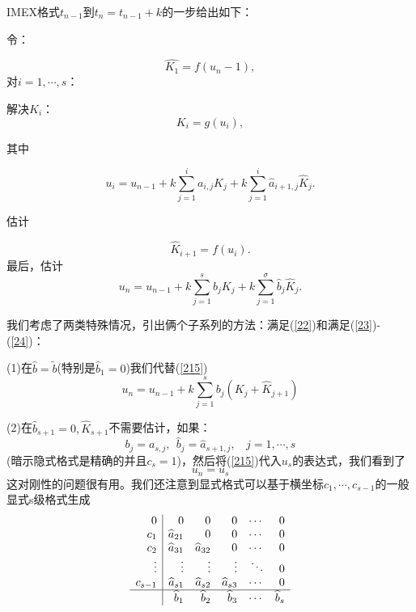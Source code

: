 \documentclass[12pt,a4paper]{article}
\numberwithin{equation}{section}
\begin{document}
IMEX格式$t_{n-1}$到$t_{n}=t_{n-1}+k$的一步给出如下：

令：

\begin{equation}
\widehat{K_{1}}=f(u_{n}-1),
\label{211}
\end{equation}
对$i=1,\cdots,s$：

\textbullet 解决$K_{i}$：
\begin{equation}
K_{i}=g(u_{i}),
\label{212}
\end{equation}

其中

\begin{equation}
u_{i}=u_{n-1}+k\sum_{j=1}^{i}a_{i,j}K_{j}+k\sum_{j=1}^{i}\widehat{a}_{i+1,j}\widehat{K}_{j}.
\label{213}
\end{equation}

\textbullet 估计

\begin{equation}
\widehat{K}_{i+1}=f(u_{i}).
\label{214}
\end{equation}
最后，估计
\begin{equation}
u_{n}=u_{n-1}+k\sum_{j=1}^{s}b_{j}K_{j}+k\sum_{j=1}^{\sigma}\widehat{b}_{j}\widehat{K}_{j}.
\label{215}
\end{equation}

我们考虑了两类特殊情况，引出俩个子系列的方法：满足(\ref{22})和满足(\ref{23})-(\ref{24})：

(1)在$\widehat{b}=\tilde{b}$(特别是$\widehat{b}_{1}=0$)我们代替(\ref{215})
\begin{equation}
u_{n}=u_{n-1}+k\sum_{j=1}^{s}b_{j}(K_{j}+\widehat{K}_{j+1})
\label{22}
\end{equation}

(2)在$\widehat{b}_{s+1}=0,\widehat{K}_{s+1}$不需要估计，如果：
\begin{equation}
b_{j}=a_{s,j},~~\widehat{b}_{j}=\widehat{a}_{s+1,j},~~~~j=1,\cdots,s
\label{23}
\end{equation}
(暗示隐式格式是精确的并且$c_{s}=1$)，然后将(\ref{215})代入$u_{s}$的表达式，我们看到了
\begin{equation}
u_{n}=u_{s}
\label{24}
\end{equation}
这对刚性的问题很有用。我们还注意到显式格式可以基于横坐标$c_{1},\cdots,c_{s-1}$的一般显式s级格式生成
\[
\begin{array}{r|r r r r r}
0 & 0 & 0 & 0 & \cdots & 0\\
c_{1}  & \widehat{a}_{21} & 0 & 0 & \cdots & 0\\
c_{2}  & \widehat{a}_{31} & \widehat{a}_{32} & 0 & \cdots & 0\\\
\vdots & \vdots & \vdots & \vdots & \ddots & 0\\
c_{s-1}  & \widehat{a}_{s1} & \widehat{a}_{s2} & \widehat{a}_{s3} & \cdots & 0\\
\hline
& \widehat{b}_{1} & \widehat{b}_{2} & \widehat{b}_{3} & \cdots & \widehat{b}_{s}
\end{array}
\]
\end{document}

